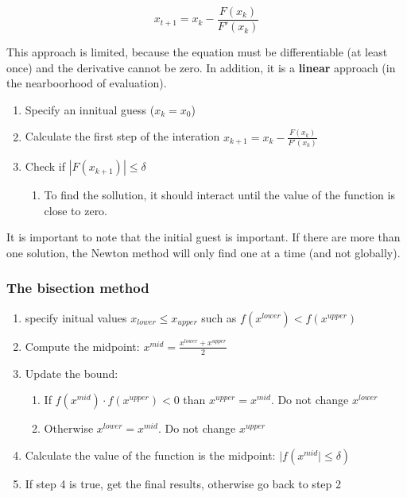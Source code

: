 \documentclass[11pt]{article}
\begin{document}
\[ x_{t+ 1} = x_{k} -  \frac{F(x_{k})}{F'(x_{k})}\]

This approach is limited, because the equation must be differentiable (at least once) and the derivative cannot be zero.
In addition, it is a \textbf{linear} approach (in the nearboorhood of evaluation).


\begin{enumerate}
\item Specify an innitual guess (\(x_{k} = x_{0}\))
\item Calculate the first step of the interation \(x_{k+ 1} = x_{k} - \frac{F(x_{k})}{F'(x_{k})}\)
\item Check if \(|F(x_{k+1})| \leq \delta\)
\begin{enumerate}
\item To find the sollution, it should interact until the value of the function is close to zero.
\end{enumerate}
\end{enumerate}

It is important to note that the initial guest is important.
If there are more than one solution, the Newton method will only find one at a time (and not globally).

\subsubsection*{The bisection method}
\label{sec:org42b0445}


\begin{enumerate}
\item specify initual values \(x_{lower} \leq x_{upper}\) such as \(f(x^{lower}) < f(x^{upper})\)
\item Compute the midpoint: \(x^{mid} = \frac{x^{lower} + x^{upper}}{2}\)
\item Update the bound:
\begin{enumerate}
\item If \(f(x^{mid}) \cdot f(x^{upper}) < 0\) than \(x^{upper} = x^{mid}\). Do not change \(x^{lower}\)
\item Otherwise \(x^{lower} = x^{mid}\). Do not change \(x^{upper}\)
\end{enumerate}
\item Calculate the value of the function is the midpoint: \(|f(x^{mid}| \leq \delta)\)
\item If step 4 is true, get the final results, otherwise go back to step 2
\end{enumerate}
\end{document}
